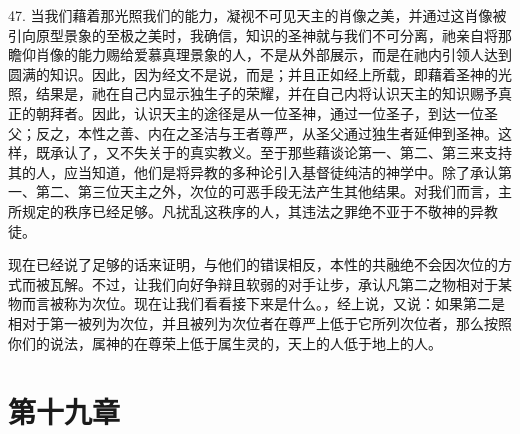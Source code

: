 47. 当我们藉着那光照我们的能力，凝视不可见天主的肖像之美，并通过这肖像被引向原型景象的至极之美时，我确信，知识的圣神就与我们不可分离，祂亲自将那瞻仰肖像的能力赐给爱慕真理景象的人，不是从外部展示，而是在祂内引领人达到圆满的知识。因此，因为经文不是说，而是；并且正如经上所载，即藉着圣神的光照，结果是，祂在自己内显示独生子的荣耀，并在自己内将认识天主的知识赐予真正的朝拜者。因此，认识天主的途径是从一位圣神，通过一位圣子，到达一位圣父；反之，本性之善、内在之圣洁与王者尊严，从圣父通过独生者延伸到圣神。这样，既承认了，又不失关于的真实教义。至于那些藉谈论第一、第二、第三来支持其的人，应当知道，他们是将异教的多种论引入基督徒纯洁的神学中。除了承认第一、第二、第三位天主之外，次位的可恶手段无法产生其他结果。对我们而言，主所规定的秩序已经足够。凡扰乱这秩序的人，其违法之罪绝不亚于不敬神的异教徒。\par

现在已经说了足够的话来证明，与他们的错误相反，本性的共融绝不会因次位的方式而被瓦解。不过，让我们向好争辩且软弱的对手让步，承认凡第二之物相对于某物而言被称为次位。现在让我们看看接下来是什么。，经上说，又说：如果第二是相对于第一被列为次位，并且被列为次位者在尊严上低于它所列次位者，那么按照你们的说法，属神的在尊荣上低于属生灵的，天上的人低于地上的人。\par


\section{第十九章}

\par

